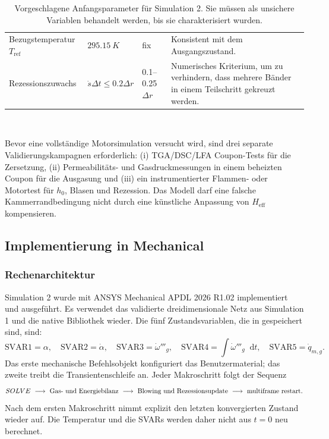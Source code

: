 \documentclass[oneside,openany]{amsdtx}
\newcommand{\dd}{\mathop{}\!\mathrm{d}}
\begin{document}
\begin{table}[H]
\begin{tabular}{L{0.18\textwidth}M{0.16\textwidth}M{0.18\textwidth}L{0.38\textwidth}}
Bezugstemperatur \(T_\mathrm{ref}\) & \(\SI{295.15}{K}\) & fix & Konsistent mit dem Ausgangszustand. \\
Rezessionszuwachs & \(\dot s\Delta t\le0.2\Delta r\) & 0.1--0.25 \(\Delta r\) & Numerisches Kriterium, um zu verhindern, dass mehrere Bänder in einem Teilschritt gekreuzt werden. \\
\bottomrule
\end{tabular}~\\[1em]
\caption{Vorgeschlagene Anfangsparameter für Simulation 2. Sie müssen als unsichere Variablen behandelt werden, bis sie charakterisiert wurden.}
\label{tab:sim2-values}
\end{table}

Bevor eine vollständige Motorsimulation versucht wird, sind drei separate Validierungskampagnen erforderlich: (i) \mbox{TGA/DSC/LFA} Coupon-Tests für die Zersetzung, (ii) Permeabilitäts- und Gasdruckmessungen in einem beheizten Coupon für die Ausgasung und (iii) ein instrumentierter Flammen- oder Motortest für \(h_0\), Blasen und Rezession. Das Modell darf eine falsche Kammerrandbedingung nicht durch eine künstliche Anpassung von \(H_\mathrm{eff}\) kompensieren.

\subsection{Implementierung in Mechanical}

\subsubsection{Rechenarchitektur}

Simulation 2 wurde mit ANSYS Mechanical APDL 2026 R1.02 implementiert und ausgeführt. Es verwendet das validierte dreidimensionale Netz aus Simulation 1 und die native Bibliothek  wieder. Die fünf Zustandsvariablen, die in  gespeichert sind, sind:
\begin{equation}
  \mathrm{SVAR1}=\alpha,\quad
  \mathrm{SVAR2}=\dot\alpha,\quad
  \mathrm{SVAR3}=\dot\omega'''_g,\quad
  \mathrm{SVAR4}=\int\dot\omega'''_g\dd t,\quad
  \mathrm{SVAR5}=\dot q_{m,g}.
\end{equation}
Das erste mechanische Befehlsobjekt konfiguriert das Benutzermaterial; das zweite treibt die Transientenschleife an. Jeder Makroschritt folgt der Sequenz
\[
SOLVE\ \longrightarrow\ \text{Gas- und Energiebilanz}\ \longrightarrow\ \text{Blowing und Rezessionsupdate}\ \longrightarrow\ \text{multiframe restart}.
\]
Nach dem ersten Makroschritt nimmt  explizit den letzten konvergierten Zustand wieder auf. Die Temperatur und die SVARs werden daher nicht aus \(t=0\) neu berechnet.
\end{document}
